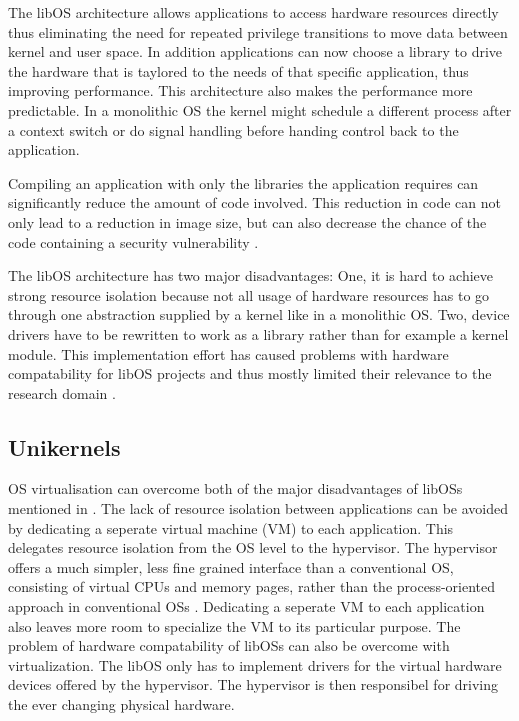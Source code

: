 \documentclass[10pt,twocolumn,a4paper]{article}
\begin{document}
    The libOS architecture allows applications to access hardware resources directly
    thus eliminating the need for repeated privilege transitions to move data
    between kernel and user space.
    In addition applications can now choose a library to drive the hardware that is
    taylored to the needs of that specific application, thus improving performance.
    This architecture also makes the performance more predictable.
    In a monolithic OS the kernel might schedule a different process after a
    context switch or do signal handling before handing control back to the application.

    Compiling an application with only the libraries the application requires
    can significantly reduce the amount of code involved.
    This reduction in code can not only lead to a reduction in image size, 
    but can also decrease the chance of the code containing a 
    security vulnerability \cite{madhavapeddy13}.

    The libOS architecture has two major disadvantages:   
    One, it is hard to achieve strong resource isolation because not all
    usage of hardware resources has to go through one abstraction supplied by
    a kernel like in a monolithic OS.
    Two, device drivers have to be rewritten to work as a library rather than
    for example a kernel module.
    This implementation effort has caused problems with hardware compatability
    for libOS projects and thus mostly limited their relevance to the
    research domain \cite{madhavapeddy13}.

  \subsection{Unikernels}
    OS virtualisation can overcome both of the major disadvantages of libOSs
    mentioned in .
    The lack of resource isolation between applications can be avoided by
    dedicating a seperate virtual machine (VM) to each application.
    This delegates resource isolation from the OS level to the hypervisor.
    The hypervisor offers a much simpler, less fine grained interface than
    a conventional OS, consisting of virtual CPUs and memory pages, 
    rather than the process-oriented approach in conventional OSs \cite{madhavapeddy13-2}.
    Dedicating a seperate VM to each application also leaves more room
    to specialize the VM to its particular purpose.
    The problem of hardware compatability of libOSs can also be overcome
    with virtualization. The libOS only has to implement drivers for
    the virtual hardware devices offered by the hypervisor.
    The hypervisor is then responsibel for driving the ever changing physical
    hardware.
\end{document}
